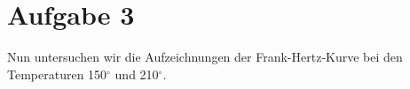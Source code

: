 \section{Aufgabe 3}

Nun untersuchen wir die Aufzeichnungen der Frank-Hertz-Kurve bei den Temperaturen 150\(^\circ\) und 210\(^\circ\). 